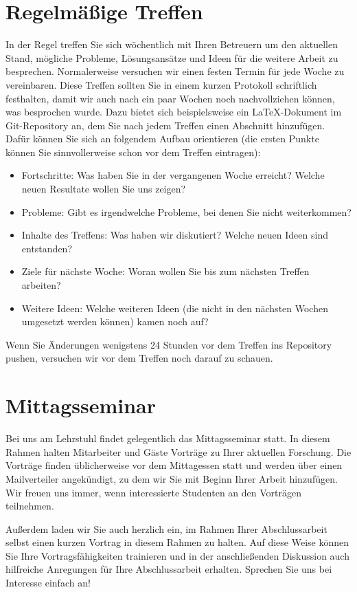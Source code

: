 \documentclass[bachelor,german]{info1thesis}
\begin{document}
\section{Regelmäßige Treffen}
In der Regel treffen Sie sich wöchentlich mit Ihren Betreuern um den aktuellen
Stand, mögliche Probleme, Lösungsansätze und Ideen für die weitere Arbeit zu
besprechen.
Normalerweise versuchen wir einen festen Termin für jede Woche zu vereinbaren.
Diese Treffen sollten Sie in einem kurzen Protokoll schriftlich festhalten,
damit wir auch nach ein paar Wochen noch nachvollziehen können, was besprochen
wurde.
Dazu bietet sich beispielsweise ein LaTeX-Dokument im Git-Repository an, dem
Sie nach jedem Treffen einen Abschnitt hinzufügen.
Dafür können Sie sich an folgendem Aufbau orientieren (die ersten Punkte
können Sie sinnvollerweise schon vor dem Treffen eintragen):
\begin{itemize}
    \item Fortschritte: Was haben Sie in der vergangenen Woche erreicht? Welche
        neuen Resultate wollen Sie uns zeigen?
    \item Probleme: Gibt es irgendwelche Probleme, bei denen Sie nicht
        weiterkommen?
    \item Inhalte des Treffens: Was haben wir diskutiert? Welche neuen Ideen
        sind entstanden?
    \item Ziele für nächste Woche: Woran wollen Sie bis zum nächsten Treffen
        arbeiten?
    \item Weitere Ideen: Welche weiteren Ideen (die nicht in den nächsten Wochen
        umgesetzt werden können) kamen noch auf?
\end{itemize}

Wenn Sie Änderungen wenigstens 24 Stunden vor dem Treffen ins Repository
pushen, versuchen wir vor dem Treffen noch darauf zu schauen.


\section{Mittagsseminar}
Bei uns am Lehrstuhl findet gelegentlich das Mittagsseminar statt.
In diesem Rahmen halten Mitarbeiter und Gäste Vorträge zu Ihrer aktuellen
Forschung.
Die Vorträge finden üblicherweise vor dem Mittagessen statt und werden über
einen Mailverteiler angekündigt, zu dem wir Sie mit Beginn Ihrer Arbeit
hinzufügen.
Wir freuen uns immer, wenn interessierte Studenten an den Vorträgen teilnehmen.

Außerdem laden wir Sie auch herzlich ein, im Rahmen Ihrer Abschlussarbeit selbst
einen kurzen Vortrag in diesem Rahmen zu halten.
Auf diese Weise können Sie Ihre Vortragsfähigkeiten trainieren und in
der anschließenden Diskussion auch hilfreiche Anregungen für Ihre
Abschlussarbeit erhalten.
Sprechen Sie uns bei Interesse einfach an!
\end{document}
